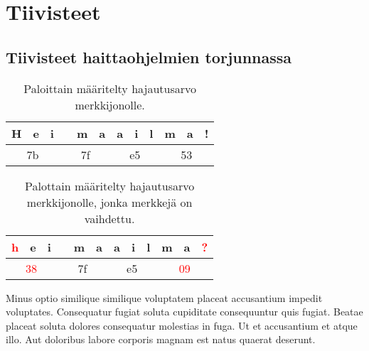 \chapter{Tiivisteet}

\section{Tiivisteet haittaohjelmien torjunnassa}

\begin{table}[h]
  \centering
\begin{tabular}{|lll|lll|lll|lll|}
\hline
\multicolumn{1}{|l|}{H} & \multicolumn{1}{l|}{e} & i & \multicolumn{1}{l|}{} & \multicolumn{1}{l|}{m} & a & \multicolumn{1}{l|}{a} & \multicolumn{1}{l|}{i} & l & \multicolumn{1}{l|}{m} & \multicolumn{1}{l|}{a} & ! \\ \hline
\multicolumn{3}{|c|}{7b}                             & \multicolumn{3}{c|}{7f}                            & \multicolumn{3}{c|}{e5}                             & \multicolumn{3}{c|}{53}                             \\ \hline
\end{tabular}
\caption{Paloittain määritelty hajautusarvo merkkijonolle.}
\end{table}


\begin{table}[h]
  \centering
  \begin{tabular}{|lll|lll|lll|lll|}
    \hline
    \multicolumn{1}{|l|}{\textcolor{red}{h}} & \multicolumn{1}{l|}{e} & i & \multicolumn{1}{l|}{} & \multicolumn{1}{l|}{m} & a & \multicolumn{1}{l|}{a} & \multicolumn{1}{l|}{i} & l & \multicolumn{1}{l|}{m} & \multicolumn{1}{l|}{a} & \textcolor{red}{?} \\ \hline
    \multicolumn{3}{|c|}{\textcolor{red}{38}}                             & \multicolumn{3}{c|}{7f}                            & \multicolumn{3}{c|}{e5}                             & \multicolumn{3}{c|}{\textcolor{red}{09}}                             \\ \hline
  \end{tabular}
  \caption{Palottain määritelty hajautusarvo merkkijonolle, jonka merkkejä on vaihdettu.}
\end{table}


Minus optio similique similique voluptatem placeat accusantium impedit voluptates. Consequatur fugiat soluta cupiditate consequuntur quis fugiat. Beatae placeat soluta dolores consequatur molestias in fuga. Ut et accusantium et atque illo. Aut doloribus labore corporis magnam est natus quaerat deserunt.

